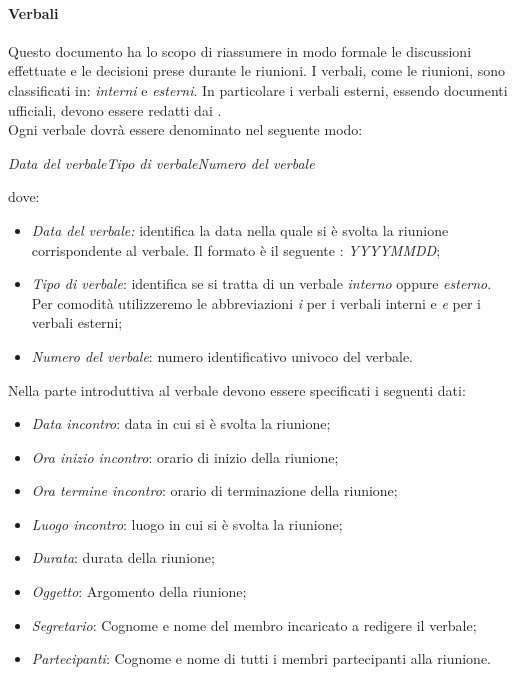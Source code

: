 \paragraph{Verbali}
Questo documento ha lo scopo di riassumere in modo formale le discussioni effettuate e le decisioni 
prese durante le riunioni. I verbali, come le riunioni, sono classificati in: 
\textsl{interni} e \textsl{esterni}. In particolare i verbali esterni, essendo 
documenti ufficiali, devono essere redatti dai \textsl{\RdP}. \\
Ogni verbale dovrà essere denominato nel seguente modo:
\begin{center}
  \textsl{{Data del verbale}{Tipo di verbale}{Numero del verbale}}
\end{center}
dove:
\begin{itemize}
  \item \textsl{Data del verbale:} identifica la data nella quale si è svolta la 
  riunione corrispondente al verbale. Il formato è il seguente : 
  \textsl{YYYYMMDD};
  \item \textsl{Tipo di verbale}: identifica se si tratta di un verbale \textsl{interno} oppure \textsl{esterno}.
  Per comodità utilizzeremo le abbreviazioni \textsl{i} per i verbali interni e \textsl{e} per i verbali 
  esterni;
  \item \textsl{Numero del verbale}: numero identificativo univoco del verbale.  
\end{itemize}
Nella parte introduttiva al verbale devono essere specificati i seguenti dati:
\begin{itemize}
  \item \textsl{Data incontro}: data in cui si è svolta la riunione;
  \item \textsl{Ora inizio incontro}: orario di inizio della riunione;
  \item \textsl{Ora termine incontro}: orario di terminazione della riunione;
  \item \textsl{Luogo incontro}: luogo in cui si è svolta la riunione;
  \item \textsl{Durata}: durata della riunione;
  \item \textsl{Oggetto}: Argomento della riunione;
  \item \textsl{Segretario}: Cognome e nome del membro incaricato a redigere il 
  verbale;
  \item \textsl{Partecipanti}: Cognome e nome di tutti i membri partecipanti 
  alla riunione.
\end{itemize}


